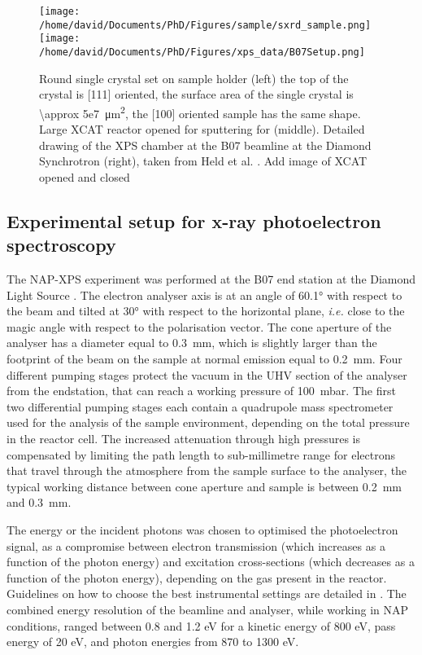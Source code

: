 \begin{figure}[!htb]
    \centering
    \texttt{[image: /home/david/Documents/PhD/Figures/sample/sxrd\_sample.png]}
    \texttt{[image: /home/david/Documents/PhD/Figures/xps\_data/B07Setup.png]}
    \caption{
        Round single crystal set on sample holder (left) the top of the crystal is [111] oriented, the surface area of the single crystal is \qty{\approx 5e7}{\um^2}, the [100] oriented sample has the same shape.
        Large XCAT reactor opened for sputtering for (middle).
        Detailed drawing of the XPS chamber at the B07 beamline at the Diamond Synchrotron (right), taken from Held et al. \parencite*{Held2020}.
        \textcolor{Important}{Add image of XCAT opened and closed}
    }
    \label{fig:SampleSXRD}
\end{figure}

\subsection{Experimental setup for x-ray photoelectron spectroscopy} \label{sec:XPS111}

The NAP-XPS experiment was performed at the B07 end station at the Diamond Light Source \parencite{Held2020}.
The electron analyser axis is at an angle of \ang{60.1} with respect to the beam and tilted at \ang{30} with respect to the horizontal plane, \textit{i.e.} close to the magic angle with respect to the polarisation vector.
The cone aperture of the analyser has a diameter equal to \qty{0.3}{\mm}, which is slightly larger than the footprint of the beam on the sample at normal emission equal to \qty{0.2}{\mm}.
Four different pumping stages protect the vacuum in the UHV section of the analyser from the endstation, that can reach a working pressure of \qty{100}{\milli\bar}.
The ﬁrst two differential pumping stages each contain a quadrupole mass spectrometer used for the analysis of the sample environment, depending on the total pressure in the reactor cell.
The increased attenuation through high pressures is compensated by limiting the path length to sub-millimetre range for electrons that travel through the atmosphere from the sample surface to the analyser, the typical working distance between cone aperture and sample is between \qty{0.2}{\mm} and \qty{0.3}{\mm}.

The energy or the incident photons was chosen to optimised the photoelectron signal, as a compromise between electron transmission (which increases as a function of the photon energy) and excitation cross-sections (which decreases as a function of the photon energy), depending on the gas present in the reactor.
Guidelines on how to choose the best instrumental settings are detailed in \parencite{Held2020}.
The combined energy resolution of the beamline and analyser, while working in NAP conditions, ranged between 0.8 and 1.2 eV for a kinetic energy of 800 eV, pass energy of 20 eV, and photon energies from 870 to 1300 eV.